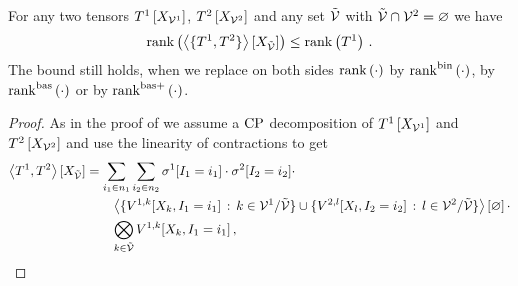 \begin{lemma}
    \label{lem:sparsityDisjointContraction}
    For any two tensors $T^{1}\left[X_{\mathcal{V}^{1}}\right]$, $T^{2}\left[X_{\mathcal{V}^{2}}\right]$ and any set $\tilde{\mathcal{V}}$ with $\tilde{\mathcal{V}}\cap\mathcal{V}^{2}=\varnothing$ we have
    \begin{align*}
        \mathrm{rank}\left(\left\langle \{T^{1},T^{2}\}\right\rangle \left[ X_{\tilde{\mathcal{V}}} \right]\right) \leq \mathrm{rank}\left(T^{1}\right) \, .
    \end{align*}
    The bound still holds, when we replace on both sides $\mathrm{rank}\left(\cdot\right)$ by $\mathrm{rank}^{\mathrm{bin}}\left(\cdot\right)$, by $\mathrm{rank}^{\mathrm{bas}}\left(\cdot\right)$ or by $\mathrm{rank}^{\mathrm{bas+}}\left(\cdot\right)$.
\end{lemma}
\begin{proof}
    As in the proof of  we assume a $\mathrm{CP}$ decomposition of $T^{1}\left[X_{\mathcal{V}^{1}}\right]$ and $T^{2}\left[X_{\mathcal{V}^{2}}\right]$ and use the linearity of contractions to get
    \begin{align*}
        \left\langle T^{1},T^{2}\right\rangle \left[ X_{\tilde{\mathcal{V}}} \right]
        &= \sum_{i_{1}\in n_{1}} \sum_{i_{2}\in n_{2}}
        \sigma^{1}[I_{1}=i_{1}] \cdot \sigma^{2}[I_{2}=i_{2}] \cdot \\
        & \quad\quad \left\langle \{V^{1,k}[X_{k},I_{1}=i_{1}] \, : \, k\in\mathcal{V}^{1}/\tilde{\mathcal{V}}\} \cup \{V^{2,l}[X_{l},I_{2}=i_{2}] \, : \, l\in\mathcal{V}^{2}/\tilde{\mathcal{V}}\}\right\rangle \left[ \varnothing \right] \cdot \\
        & \quad\quad \bigotimes_{k\in\tilde{\mathcal{V}}} V^{1,k}[X_{k},I_{1}=i_{1}] \, ,
    \end{align*}

\end{proof}
